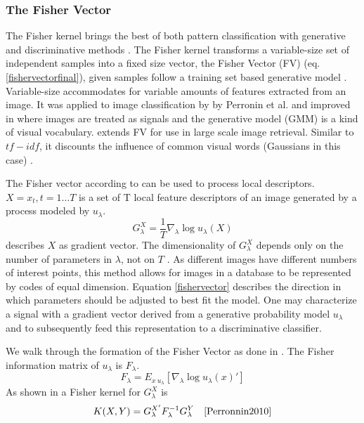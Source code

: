 \documentclass[english,12pt,a4paper,pdftex,elec,utf8]{aaltothesis}
\begin{document}
\subsubsection{The Fisher Vector}\label{FV}
The Fisher kernel brings the best of both pattern classification with generative and discriminative methods \cite{Jaakkola1999}. The Fisher kernel transforms a variable-size set of independent samples into a fixed size vector, the Fisher Vector (FV) (eq. \ref{fishervectorfinal}), given samples follow a training set based generative model \cite{Jaakkola1999}. Variable-size accommodates for variable amounts of features extracted from an image. It was applied to image classification by by Perronin et al. \cite{Perronnin2007} and improved in \cite{Perronnin2010} where images are treated as signals and the generative model (GMM) is a kind of visual vocabulary. \cite{Perronnin2010a} extends FV for use in large scale image retrieval. Similar to $tf-idf$, it discounts the influence of common visual words (Gaussians in this case) \cite{Perronnin2010a}.

The Fisher vector according to \cite{Perronnin2010} can be used to process local descriptors. $X = {x_t, t = 1 \ldots T}$ is a set of T local feature descriptors of an image generated by a process modeled by $u_\lambda$.
\begin{equation}\label{fishervector}
 G_\lambda^X = \frac{1}{T}\nabla_\lambda\log u_\lambda(X)
\end{equation}
describes $X$ as gradient vector. The dimensionality of $G_\lambda^X$ depends only on the number of parameters in $\lambda$, not on $T$ \cite{Perronnin2010}. As different images have different numbers of interest points, this method allows for images in a database to be represented by codes of equal dimension. Equation \ref{fishervector} describes the direction in which parameters should be adjusted to best fit the model. One may characterize a signal with a gradient vector derived from a generative probability model $u_\lambda$ and to subsequently feed this representation to a discriminative classifier. \cite{Perronnin2007}

We walk through the formation of the Fisher Vector as done in \cite{Perronnin2010}. The Fisher information matrix of $u_\lambda$ is $F_\lambda$.
\begin{equation}\label{fishermatrix}
F_\lambda = E_{x~u_\lambda}[\nabla_\lambda\log u_\lambda(x)']
\end{equation}
As shown in \cite{Jaakkola1999} a Fisher kernel for $G_\lambda^X$ is
\begin{equation}\label{fisherkernel}
K(X,Y) = G_\lambda^{X'}F_\lambda^{-1}G_\lambda^Y \quad \cite{Perronnin2010}
\end{equation}
\end{document}
